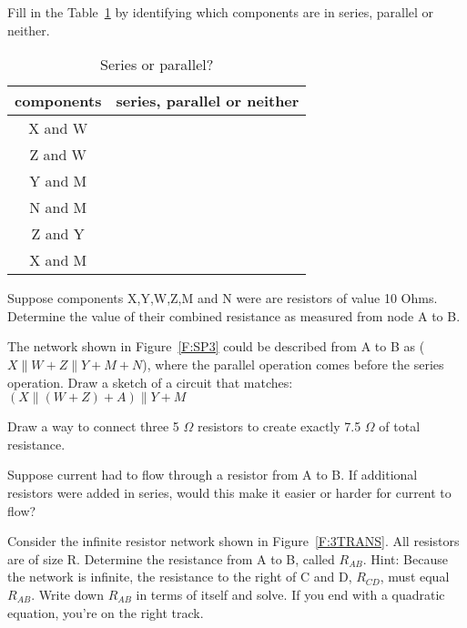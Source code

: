 \begin{clevel}
Fill in the Table~\ref{T:3SP} by identifying which components are in series, parallel or neither.
\end{clevel}

\begin{table}[H]
\begin{center}
\begin{tabular}{|c|c|} \hline
components & series, parallel or neither \\ \hline
X and W &	\\ \hline
Z and W &	\\ \hline
Y and M &	\\ \hline
N and M &	\\ \hline
Z and Y &	\\ \hline
X and M &	\\ \hline
\end{tabular}
\caption{Series or parallel?}
\label{T:3SP}
\end{center}
\end{table}

\begin{clevel}
Suppose components X,Y,W,Z,M and N were are resistors of value 10 Ohms. Determine the value of their combined resistance as measured from node A to B.
\end{clevel}

\begin{blevel}
The network shown in Figure~\ref{F:SP3} could be described from A to B as ($X \parallel W+Z \parallel Y+M+N$), where the parallel operation comes before the series operation. Draw a sketch of a circuit that matches:  $(X \parallel (W+Z)+A)\parallel Y+M$
\end{blevel}

\begin{blevel}
Draw a way to connect three 5 $\Omega$ resistors to create exactly 7.5 $\Omega$ of total resistance.
\end{blevel}

\begin{alevel}
Suppose current had to flow through a resistor from A to B. If additional resistors were added in series, would this make it easier or harder for current to flow?
\end{alevel}

\begin{clevel}
Consider the infinite resistor network shown in Figure~\ref{F:3TRANS}. All resistors are of size R. Determine the resistance from A to B, called $R_{AB}$. Hint: Because the network is infinite, the resistance to the right of C and D, $R_{CD}$, must equal $R_{AB}$. Write down $R_{AB}$ in terms of itself and solve. If you end with a quadratic equation, you're on the right track.
\end{clevel}

